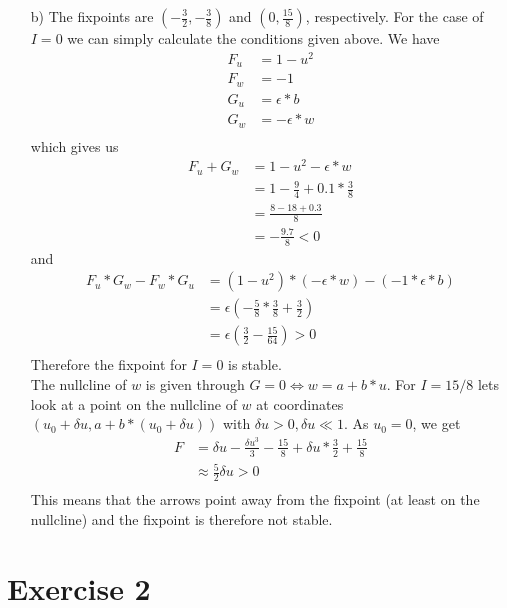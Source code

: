 \documentclass[a4paper]{article}
\begin{document}
\begin{itemize}
\item[b)]
The fixpoints are $(-\frac{3}{2}, -\frac{3}{8})$ and
$(0,\frac{15}{8})$, respectively. For the case of $I=0$ we can simply calculate
the conditions given above. We have
\begin{align*}
    F_u &= 1-u^2\\
    F_w &= -1\\
    G_u &= \epsilon*b\\
    G_w &= -\epsilon*w\\
\end{align*}
which gives us
\begin{align*}
    F_u+G_w &= 1-u^2-\epsilon*w\\
    &= 1-\frac{9}{4}+0.1*\frac{3}{8}\\
    &= \frac{8-18+0.3}{8}\\
    &= -\frac{9.7}{8}<0
\end{align*}
and
\begin{align*}
    F_u*G_w-F_w*G_u &= (1-u^2)*(-\epsilon*w) - (-1*\epsilon*b)\\
    &= \epsilon(-\frac{5}{8}*\frac{3}{8}+\frac{3}{2})\\
    &= \epsilon(\frac{3}{2}-\frac{15}{64}) > 0\\
\end{align*}
Therefore the fixpoint for $I=0$ is stable.\\
The nullcline of $w$ is given through $G=0\Leftrightarrow w=a+b*u$.
For $I=15/8$ lets look at a point on the nullcline of $w$ at coordinates $(u_0+\delta u, a+b*(u_0+\delta u))$ with $\delta u>0, \delta u \ll 1$.
As $u_0=0$, we get
\begin{align*}
    F&=\delta u - \frac{{\delta u}^3}{3}-\frac{15}{8}+\delta u *\frac{3}{2}+\frac{15}{8}\\
    &\approx \frac{5}{2} \delta u > 0\\
\end{align*}
This means that the arrows point away from the fixpoint (at least on the nullcline)
and the fixpoint is therefore not stable.
\end{itemize}

\section*{Exercise 2}
\end{document}
